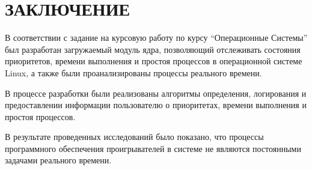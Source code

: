 \section*{ЗАКЛЮЧЕНИЕ}

В соответствии с задание на курсовую работу по курсу ``Операционные Системы'' был разработан загружаемый модуль ядра, позволяющий отслеживать состояния приоритетов, времени выполнения и простоя процессов в операционной системе Linux, а также были проанализированы процессы реального времени.

В процессе разработки были реализованы алгоритмы определения, логирования и предоставлении информации пользователю о приоритетах, времени выполнения и простоя процессов.

В результате проведенных исследований было показано, что процессы программного обеспечения проигрывателей в системе не являются постоянными задачами реального времени. 

\pagebreak